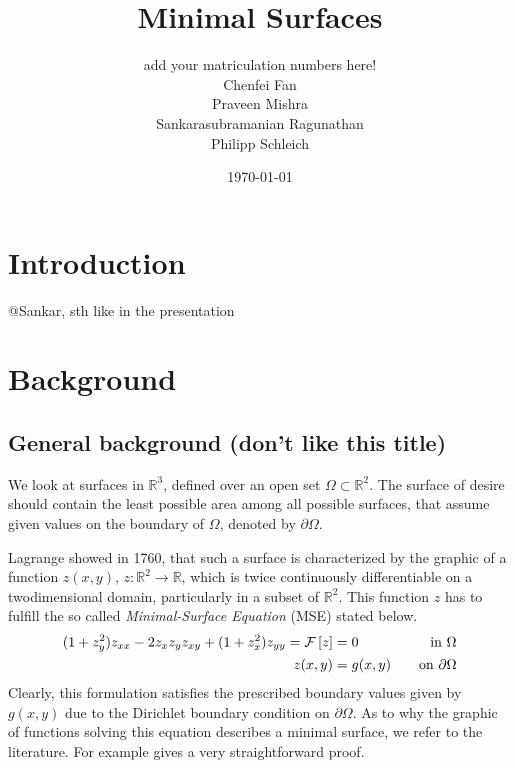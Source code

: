 \documentclass[11pt]{scrartcl}
\title{Minimal Surfaces}
\author{add your matriculation numbers here!\\Chenfei Fan \\  Praveen Mishra \\ Sankarasubramanian Ragunathan\\ Philipp Schleich\quad 391779}
\date{\today \\ \vspace{0.9cm}}
\newcommand{\mSurf}[1]{\ensuremath{\mathcal{F}\left[#1\right]}}
\begin{document}
\maketitle

%
\clearpage
\protect \tableofcontents



\newpage
	
\onehalfspacing
\section{Introduction}
@Sankar, sth like in the presentation
\section{Background}
\subsection{General background (don't like this title)}
We look at surfaces in $ \mathbb{R}^3 $, defined over an open set $\Omega \subset \mathbb{R}^2$. 
The surface of desire should contain the least possible area among all possible surfaces, that assume given values on the boundary of $\Omega$, denoted by $\partial \Omega$. \cite{Sakai1976}

Lagrange showed in 1760, that such a surface is characterized by the graphic of a function $z(x,y)$, $z: \mathbb{R}^2 \to \mathbb{R} $, which is twice continuously differentiable on a twodimensional domain, particularly in a subset of $\mathbb{R}^2$.
This function $z$ has to fulfill the so called \textit{Minimal-Surface Equation} (MSE) stated below.
\begin{align}\label{eq:MSE}
	(1+z_y^2) z_{xx} - 2 z_x z_y z_{xy} + (1+z_x^2)z_{yy} = \mSurf{z} &= 0 \quad &\text{in } \Omega \\
	z(x,y) &= g(x,y) \quad &\text{on } \partial \Omega \notag
\end{align}
Clearly, this formulation satisfies the prescribed boundary values given by $g(x,y)$ due to the Dirichlet boundary condition on $\partial\Omega$.
As to why the graphic of functions solving this equation describes a minimal surface, we refer to the literature. For example \cite{Sakai1976} gives a very straightforward proof.
\end{document}
